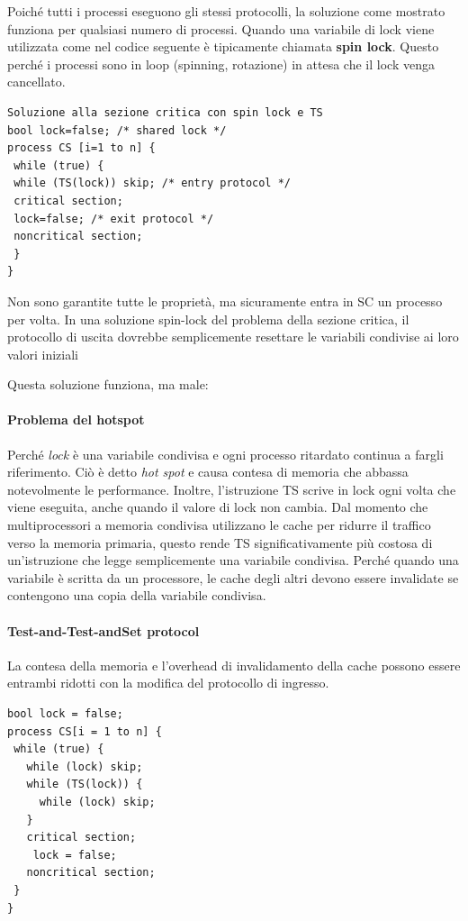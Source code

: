 \documentclass[10pt,a4paper]{book}
\begin{document}
Poiché tutti i processi eseguono gli stessi protocolli, la soluzione come mostrato funziona per qualsiasi numero di processi. Quando una variabile di lock viene utilizzata come nel codice seguente è tipicamente chiamata \textbf{spin lock}. Questo perché i processi sono in loop (spinning, rotazione) in attesa che il lock venga cancellato. 

\begin{verbatim}
Soluzione alla sezione critica con spin lock e TS
bool lock=false; /* shared lock */
process CS [i=1 to n] {
 while (true) {
 while (TS(lock)) skip; /* entry protocol */
 critical section;
 lock=false; /* exit protocol */
 noncritical section;
 }
} 
\end{verbatim}

Non sono garantite tutte le proprietà, ma sicuramente entra in SC un processo per volta.
In una soluzione spin-lock del problema della sezione critica, il protocollo di uscita dovrebbe semplicemente resettare le variabili condivise ai loro valori iniziali

Questa soluzione funziona, ma male:

\paragraph{Problema del hotspot}
Perché \textit{lock} è una variabile condivisa e ogni processo ritardato continua a fargli riferimento. Ciò è detto \textit{hot spot} e causa contesa di memoria che abbassa notevolmente le performance.
Inoltre, l'istruzione TS scrive in lock ogni volta che viene eseguita, anche quando il valore di lock non cambia. Dal momento che multiprocessori a memoria condivisa utilizzano le cache per ridurre il traffico verso la memoria primaria, questo rende TS significativamente più costosa di un'istruzione che legge semplicemente una variabile condivisa. Perché quando una variabile è scritta da un processore, le cache degli altri devono essere invalidate se contengono una copia della variabile condivisa.

\paragraph{Test-and-Test-andSet protocol}
La contesa della memoria e l'overhead di invalidamento della cache possono essere entrambi ridotti con la modifica del protocollo di ingresso.
\begin{verbatim}
bool lock = false;
process CS[i = 1 to n] {
 while (true) {
   while (lock) skip;
   while (TS(lock)) {
     while (lock) skip;
   }
   critical section;
    lock = false;
   noncritical section;
 }
}
\end{verbatim}
\end{document}
